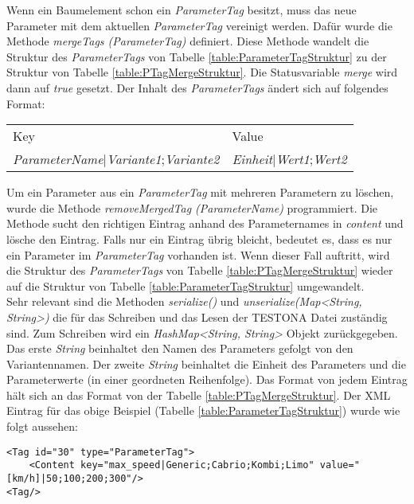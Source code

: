 Wenn ein Baumelement schon ein \textit{ParameterTag} besitzt, muss das neue Parameter mit dem aktuellen \textit{ParameterTag} vereinigt werden. Dafür wurde die Methode \textit{mergeTags (ParameterTag)} definiert. Diese Methode wandelt die Struktur des \textit{ParameterTags} von Tabelle \ref{table:ParameterTagStruktur} zu der Struktur von Tabelle \ref{table:PTagMergeStruktur}. Die Statusvariable \textit{merge} wird dann auf \textit{true} gesetzt. Der Inhalt des \textit{ParameterTags} ändert sich auf folgendes Format:

\begin{center}
\begin{tabular}{l l}
Key									&Value\\
\textit{ParameterName}|\textit{Variante1};\textit{Variante2}		&\textit{Einheit}|\textit{Wert1};\textit{Wert2}\\
\end{tabular}
\end{center}


Um ein Parameter aus ein \textit{ParameterTag} mit mehreren Parametern zu löschen, wurde die Methode \textit{removeMergedTag (ParameterName)} programmiert. Die Methode sucht den richtigen Eintrag anhand des Parameternames in \textit{content} und lösche den Eintrag. Falls nur ein Eintrag übrig bleicht, bedeutet es, dass es nur ein Parameter im \textit{ParameterTag} vorhanden ist. Wenn dieser Fall auftritt, wird die Struktur des \textit{ParameterTags} von Tabelle \ref{table:PTagMergeStruktur} wieder auf die Struktur von Tabelle \ref{table:ParameterTagStruktur} umgewandelt.\\


Sehr relevant sind die Methoden \textit{serialize()} und \textit{unserialize(Map<String, String>)} die für das Schreiben und das Lesen der TESTONA Datei zuständig sind. Zum Schreiben wird ein \textit{HashMap<String, String>} Objekt zurückgegeben. Das erste \textit{String} beinhaltet den Namen des Parameters gefolgt von den Variantennamen. Der zweite \textit{String} beinhaltet die Einheit des Parameters und die Parameterwerte (in einer geordneten Reihenfolge). Das Format von jedem Eintrag hält sich an das Format von der Tabelle \ref{table:PTagMergeStruktur}. Der XML Eintrag für das obige Beispiel (Tabelle \ref{table:ParameterTagStruktur}) wurde wie folgt aussehen:\\

\begin{lstlisting}[caption={XML Darstellung eines ParameterTags}, captionpos=b]
<Tag id="30" type="ParameterTag">
	<Content key="max_speed|Generic;Cabrio;Kombi;Limo" value="[km/h]|50;100;200;300"/>
<Tag/>
\end{lstlisting}


